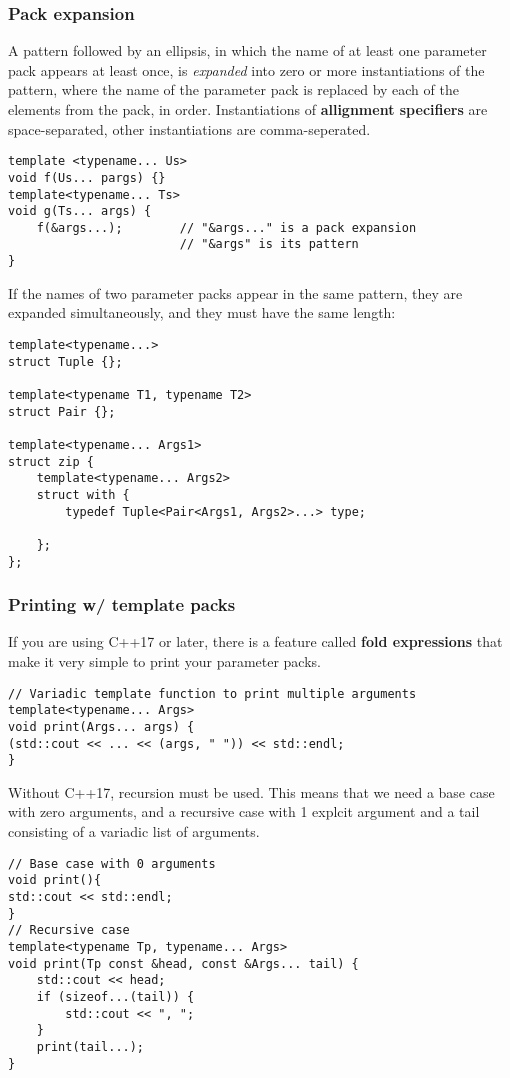 \documentclass{report}
\begin{document}
\subsubsection{Pack expansion}
A pattern followed by an ellipsis, in which the name of at least one parameter pack appears at least once, is \textit{expanded} into zero or more instantiations of the pattern, where the name of the parameter pack is replaced by each of the elements from the pack, in order. Instantiations of \textbf{allignment specifiers} are space-separated, other instantiations are comma-seperated.
\begin{verbatim}
template <typename... Us>
void f(Us... pargs) {}
template<typename... Ts>
void g(Ts... args) {
    f(&args...);        // "&args..." is a pack expansion
                        // "&args" is its pattern
}
\end{verbatim}
If the names of two parameter packs appear in the same pattern, they are expanded simultaneously, and they must have the same length:
\begin{verbatim}
template<typename...>
struct Tuple {};

template<typename T1, typename T2>
struct Pair {};

template<typename... Args1>
struct zip {
    template<typename... Args2>
    struct with {
        typedef Tuple<Pair<Args1, Args2>...> type;
        
    };
};
\end{verbatim}
\subsubsection*{Printing w/ template packs}
If you are using C++17 or later, there is a feature called \textbf{fold expressions} that make it very simple to print your parameter packs.
\begin{verbatim}
// Variadic template function to print multiple arguments
template<typename... Args>
void print(Args... args) {
(std::cout << ... << (args, " ")) << std::endl;
}
\end{verbatim}
Without C++17, recursion must be used. This means that we need a base case with zero arguments, and a recursive case with 1 explcit argument and a tail consisting of a variadic list of arguments.
\begin{verbatim}
// Base case with 0 arguments
void print(){
std::cout << std::endl;
}
// Recursive case
template<typename Tp, typename... Args>
void print(Tp const &head, const &Args... tail) {
    std::cout << head;
    if (sizeof...(tail)) {
        std::cout << ", ";
    }
    print(tail...);
}
\end{verbatim}
\end{document}
